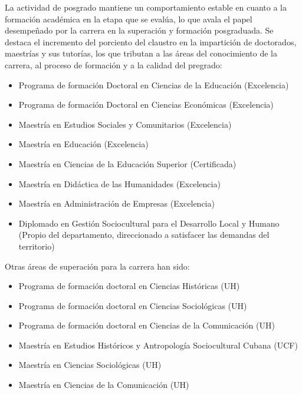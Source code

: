 La actividad de posgrado mantiene un comportamiento estable en cuanto a la formación académica en la etapa que se evalúa, lo que avala el papel desempeñado por la carrera en la superación y formación posgraduada. Se destaca el incremento del porciento del claustro en la impartición de doctorados, maestrías y sus tutorías, los que tributan a las áreas del conocimiento de la carrera, al proceso de formación y a la calidad del pregrado:

\begin{itemize}
	\setlength\itemsep{-0.5em}
	\item Programa de formación Doctoral en Ciencias de la Educación (Excelencia)
	\item Programa de formación Doctoral en Ciencias Económicas (Excelencia)
	\item Maestría en Estudios Sociales y Comunitarios (Excelencia)
	\item Maestría en Educación (Excelencia)
	\item Maestría en Ciencias de la Educación Superior (Certificada)
	\item Maestría en Didáctica de las Humanidades (Excelencia)
	\item Maestría en Administración de Empresas (Excelencia)
	\item Diplomado en Gestión Sociocultural para el Desarrollo Local y Humano (Propio del departamento, direccionado a satisfacer las demandas del territorio)
\end{itemize}

Otras áreas de superación para la carrera han sido:

\begin{itemize}
	\setlength\itemsep{-0.5em}
	\item Programa de formación doctoral en Ciencias Históricas (UH)
	\item Programa de formación doctoral en Ciencias Sociológicas (UH)
	\item Programa de formación doctoral en Ciencias de la Comunicación (UH)
	\item Maestría en Estudios Históricos y Antropología Sociocultural Cubana (UCF)
	\item Maestría en Ciencias Sociológicas (UH)
	\item Maestría en Ciencias de la Comunicación (UH)
\end{itemize}